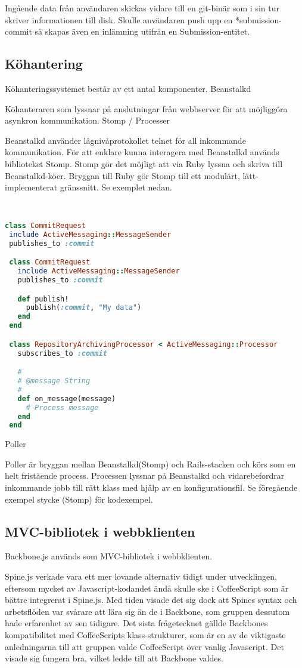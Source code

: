 Ingående data från användaren skickas vidare till en git-binär som i sin tur skriver informationen till disk. Skulle användaren push upp en *submission-commit så skapas även en inlämning utifrån en Submission-entitet.
\subsection{Köhantering}
Köhanteringssystemet består av ett antal komponenter.
Beanstalkd

Köhanteraren som lyssnar på anslutningar från webbserver för att möjliggöra asynkron kommunikation.
Stomp / Processer

Beanstalkd använder lågnivåprotokollet telnet för all inkommande kommunikation. För att enklare kunna interagera med Beanstalkd används biblioteket Stomp. Stomp gör det möjligt att via Ruby lyssna och skriva till Beanstalkd-köer. Bryggan till Ruby gör Stomp till ett modulärt, lätt-implementerat gränssnitt. Se exemplet nedan.

\begin{lstlisting}[language=Ruby]


class CommitRequest
 include ActiveMessaging::MessageSender
 publishes_to :commit

 class CommitRequest
   include ActiveMessaging::MessageSender
   publishes_to :commit

   def publish!
     publish(:commit, "My data")
   end
 end

 class RepositoryArchivingProcessor < ActiveMessaging::Processor
   subscribes_to :commit

   #
   # @message String
   #
   def on_message(message)
     # Process message
   end
 end
\end{lstlisting}

Poller

Poller är bryggan mellan Beanstalkd(Stomp) och Rails-stacken och körs som en helt fristående process. Processen lyssnar på Beanstalkd och vidarebefordrar inkommande jobb till rätt klass med hjälp av en konfigurationsfil. Se föregående exempel stycke (Stomp) för kodexempel.

\subsection{MVC-bibliotek i webbklienten}
Backbone.js används som MVC-bibliotek i webbklienten.

Spine.js verkade vara ett mer lovande alternativ tidigt under utvecklingen, eftersom mycket av Javascript-kodandet ändå skulle ske i CoffeeScript som är bättre integrerat i Spine.js. Med tiden visade det sig dock att Spines syntax och arbetsflöden var svårare att lära sig än de i Backbone, som gruppen dessutom hade erfarenhet av sen tidigare. Det sista frågetecknet gällde Backbones kompatibilitet med CoffeeScripts klass-strukturer, som är en av de viktigaste anledningarna till att gruppen valde CoffeeScript över vanlig Javascript. Det visade sig fungera bra, vilket ledde till att Backbone valdes.

